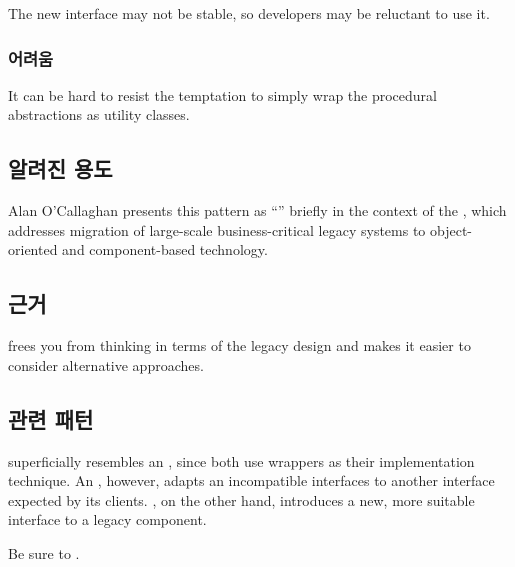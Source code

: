 \documentclass[a4paper,10pt,twoside]{book}
\begin{document}
\begin{bulletlist}
\item The new interface may not be stable, so developers may be reluctant to use it.
\end{bulletlist}

\subsubsection*{어려움}

\begin{bulletlist}
\item It can be hard to resist the temptation to simply wrap the procedural abstractions as utility classes.
\end{bulletlist}

\subsection*{알려진 용도}

Alan O'Callaghan \cite{Ocal00a} presents this pattern as ``'' briefly in the context of the , which addresses migration of large-scale business-critical legacy systems to object-oriented and component-based technology. 

\subsection*{근거}

 frees you from thinking in terms of the legacy design and makes it easier to consider alternative approaches.

\subsection*{관련 패턴}

 superficially resembles an , since both use wrappers as their implementation technique. An , however, adapts an incompatible interfaces to another interface expected by its clients. , on the other hand, introduces a new, more suitable interface to a legacy component. 

Be sure to . 
\end{document}
